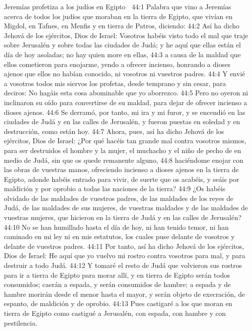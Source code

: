 Jeremías profetiza a los judíos en Egipto  

44:1 Palabra que vino a Jeremías acerca de todos los judíos que moraban en la tierra de Egipto, que vivían en Migdol, en Tafnes, en Menfis y en tierra de Patros, diciendo:  
44:2 Así ha dicho Jehová de los ejércitos, Dios de Israel: Vosotros habéis visto todo el mal que traje sobre Jerusalén y sobre todas las ciudades de Judá; y he aquí que ellas están el día de hoy asoladas; no hay quien more en ellas,  
44:3 a causa de la maldad que ellos cometieron para enojarme, yendo a ofrecer incienso, honrando a dioses ajenos que ellos no habían conocido, ni vosotros ni vuestros padres.  
44:4 Y envié a vosotros todos mis siervos los profetas, desde temprano y sin cesar, para deciros: No hagáis esta cosa abominable que yo aborrezco.  
44:5 Pero no oyeron ni inclinaron su oído para convertirse de su maldad, para dejar de ofrecer incienso a dioses ajenos.  
44:6 Se derramó, por tanto, mi ira y mi furor, y se encendió en las ciudades de Judá y en las calles de Jerusalén, y fueron puestas en soledad y en destrucción, como están hoy.  
44:7 Ahora, pues, así ha dicho Jehová de los ejércitos, Dios de Israel: ¿Por qué hacéis tan grande mal contra vosotros mismos, para ser destruidos el hombre y la mujer, el muchacho y el niño de pecho de en medio de Judá, sin que os quede remanente alguno,  
44:8 haciéndome enojar con las obras de vuestras manos, ofreciendo incienso a dioses ajenos en la tierra de Egipto, adonde habéis entrado para vivir, de suerte que os acabéis, y seáis por maldición y por oprobio a todas las naciones de la tierra?  
44:9 ¿Os habéis olvidado de las maldades de vuestros padres, de las maldades de los reyes de Judá, de las maldades de sus mujeres, de vuestras maldades y de las maldades de vuestras mujeres, que hicieron en la tierra de Judá y en las calles de Jerusalén?  
44:10 No se han humillado hasta el día de hoy, ni han tenido temor, ni han caminado en mi ley ni en mis estatutos, los cuales puse delante de vosotros y delante de vuestros padres.  
44:11 Por tanto, así ha dicho Jehová de los ejércitos, Dios de Israel: He aquí que yo vuelvo mi rostro contra vosotros para mal, y para destruir a todo Judá.  
44:12 Y tomaré el resto de Judá que volvieron sus rostros para ir a tierra de Egipto para morar allí, y en tierra de Egipto serán todos consumidos; caerán a espada, y serán consumidos de hambre; a espada y de hambre morirán desde el menor hasta el mayor, y serán objeto de execración, de espanto, de maldición y de oprobio.  
44:13 Pues castigaré a los que moran en tierra de Egipto como castigué a Jerusalén, con espada, con hambre y con pestilencia.  
